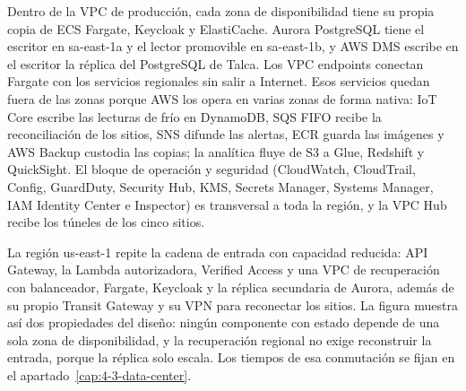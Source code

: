 Dentro de la VPC de producción, cada zona de disponibilidad tiene su propia copia de ECS Fargate, Keycloak y ElastiCache. Aurora PostgreSQL tiene el escritor en sa-east-1a y el lector promovible en sa-east-1b, y AWS DMS escribe en el escritor la réplica del PostgreSQL de Talca. Los VPC endpoints conectan Fargate con los servicios regionales sin salir a Internet. Esos servicios quedan fuera de las zonas porque AWS los opera en varias zonas de forma nativa: IoT Core escribe las lecturas de frío en DynamoDB, SQS FIFO recibe la reconciliación de los sitios, SNS difunde las alertas, ECR guarda las imágenes y AWS Backup custodia las copias; la analítica fluye de S3 a Glue, Redshift y QuickSight. El bloque de operación y seguridad (CloudWatch, CloudTrail, Config, GuardDuty, Security Hub, KMS, Secrets Manager, Systems Manager, IAM Identity Center e Inspector) es transversal a toda la región, y la VPC Hub recibe los túneles de los cinco sitios.

La región us-east-1 repite la cadena de entrada con capacidad reducida: API Gateway, la Lambda autorizadora, Verified Access y una VPC de recuperación con balanceador, Fargate, Keycloak y la réplica secundaria de Aurora, además de su propio Transit Gateway y su VPN para reconectar los sitios. La figura muestra así dos propiedades del diseño: ningún componente con estado depende de una sola zona de disponibilidad, y la recuperación regional no exige reconstruir la entrada, porque la réplica solo escala. Los tiempos de esa conmutación se fijan en el apartado~\ref{cap:4-3-data-center}.
